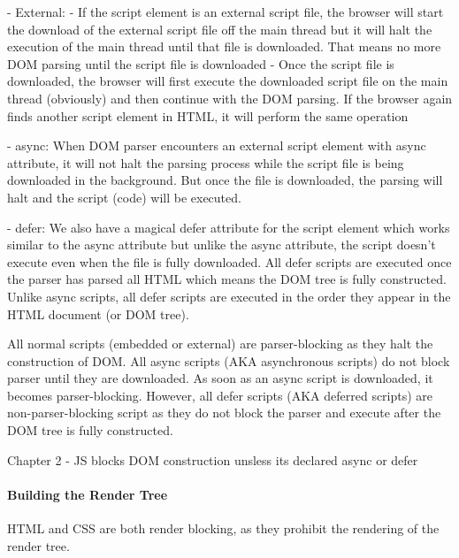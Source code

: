 - External:
- If the script element is an external script file, the browser will start the download of the external script file off the main thread but it will halt the execution of the main thread until that file is downloaded. That means no more DOM parsing until the script file is downloaded
- Once the script file is downloaded, the browser will first execute the downloaded script file on the main thread (obviously) and then continue with the DOM parsing. If the browser again finds another script element in HTML, it will perform the same operation

- async:
When DOM parser encounters an external script element with async attribute, it will not halt the parsing process while the script file is being downloaded in the background. But once the file is downloaded, the parsing will halt and the script (code) will be executed.


- defer:
We also have a magical defer attribute for the script element which works similar to the async attribute but unlike the async attribute, the script doesn’t execute even when the file is fully downloaded. All defer scripts are executed once the parser has parsed all HTML which means the DOM tree is fully constructed. Unlike async scripts, all defer scripts are executed in the order they appear in the HTML document (or DOM tree).


All normal scripts (embedded or external) are parser-blocking as they halt the construction of DOM. All async scripts (AKA asynchronous scripts) do not block parser until they are downloaded. As soon as an async script is downloaded, it becomes parser-blocking. However, all defer scripts (AKA deferred scripts) are non-parser-blocking script as they do not block the parser and execute after the DOM tree is fully constructed.




Chapter 2
- JS blocks DOM construction unsless its declared async or defer








\paragraph{Building the Render Tree}


HTML and CSS are both render blocking, as they prohibit the rendering of the render tree.


